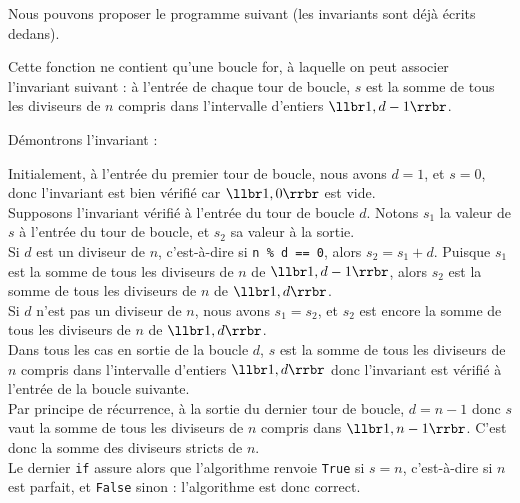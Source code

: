 Nous pouvons proposer le programme suivant (les invariants sont déjà écrits dedans).


Cette fonction ne contient qu'une boucle for, à laquelle on peut associer l'invariant suivant : à l'entrée de 
chaque tour de boucle, $s$ est la somme de tous les diviseurs de 
$n$ compris dans l'intervalle d'entiers $\llbr 1,d-1\rrbr$.

Démontrons l'invariant : 

Initialement, à l'entrée du premier tour de boucle, nous avons $d=1$, et $s=0$, donc l'invariant est bien vérifié car 
$\llbr 1,0\rrbr$ est vide.\\
Supposons l'invariant vérifié à l'entrée du tour de boucle $d$. Notons $s_1$ la valeur de $s$ à l'entrée du tour de 
boucle, et $s_2$ sa valeur à la sortie.\\
Si $d$ est un diviseur de $n$, c'est-à-dire si \texttt{n \% d == 0}, alors $s_2=s_1+d$. Puisque 
$s_1$ est la somme de tous les diviseurs de $n$ de $\llbr 1,d-1\rrbr$, alors $s_2$ est la somme de tous les 
diviseurs de $n$ de $\llbr 1,d\rrbr$.\\
Si $d$ n'est pas un diviseur de $n$, nous avons $s_1=s_2$, et $s_2$ est encore la somme de tous les 
diviseurs de $n$ de $\llbr 1,d\rrbr$.\\
Dans tous les cas en sortie de la boucle $d$, $s$ est la somme de tous les diviseurs de 
$n$ compris dans l'intervalle d'entiers $\llbr 1,d\rrbr$ donc l'invariant est vérifié à l'entrée de la boucle 
suivante.\\

Par principe de récurrence, à la sortie du dernier tour de boucle, $d=n-1$ donc $s$ vaut la somme de tous les diviseurs 
de $n$ compris dans $\llbr 1,n-1\rrbr$. C'est donc la somme des diviseurs stricts de $n$.\\
Le dernier \texttt{if} assure alors que l'algorithme renvoie \texttt{True} si $s=n$, c'est-à-dire si $n$ est parfait, 
et \texttt{False} sinon : l'algorithme est donc correct.

